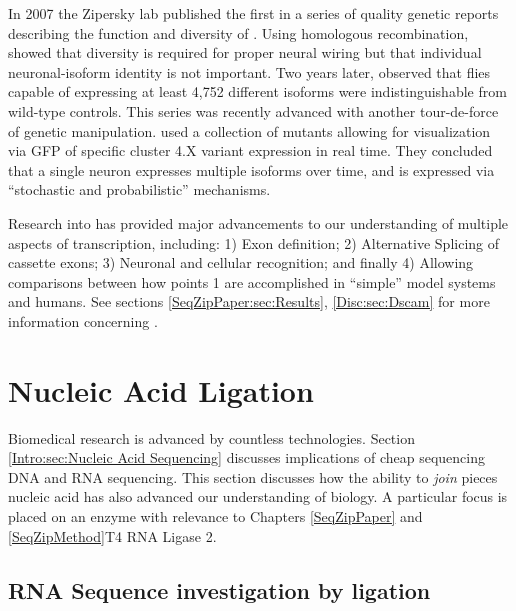     In 2007 the Zipersky lab published \citep{Hattori2007} the first in a series of quality genetic reports describing the function and diversity of \dscam{}. Using homologous recombination, \citet{Hattori2007} showed that \dscam{} diversity is required for proper neural wiring but that individual neuronal-isoform identity is not important. Two years later, \citet{Hattori2009} observed that flies capable of expressing at least 4,752 different \dscam{} isoforms were indistinguishable from wild-type controls. This series was recently advanced with another tour-de-force of genetic manipulation. \citet{Miura2013b} used a collection of \dscam{} mutants allowing for visualization via GFP of specific cluster 4.X variant expression in real time. They concluded that a single neuron expresses multiple \dscam{} isoforms over time, and \dscam{} is expressed via ``stochastic and probabilistic'' mechanisms.

    Research into \flies{} \dscam{} has provided major advancements to our understanding of multiple aspects of transcription, including: 1) Exon definition; 2) Alternative Splicing of cassette exons; 3) Neuronal and cellular recognition; and finally 4) Allowing comparisons between how points 1 are accomplished in ``simple'' model systems and humans. See sections \ref{SeqZipPaper:sec:Results}, \ref{Disc:sec:Dscam} for more information concerning \dscam{}.

\section{Nucleic Acid Ligation}
  \label{Intro:sec:Nucleic Acid Ligation}

  Biomedical research is advanced by countless technologies. Section \ref{Intro:sec:Nucleic Acid Sequencing} discusses implications of cheap sequencing DNA and RNA sequencing. This section discusses how the ability to \textit{join} pieces nucleic acid has also advanced our understanding of biology. A particular focus is placed on an enzyme with relevance to Chapters \ref{SeqZipPaper} and \ref{SeqZipMethod}\textemdash T4 RNA Ligase 2.

  \subsection{RNA Sequence investigation by ligation}
    \label{Intro:subsec:Ligation}

